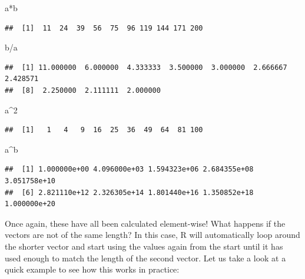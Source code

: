 \documentclass[
]{book}
\newenvironment{Shaded}{\begin{snugshade}}{\end{snugshade}}
\newcommand{\DecValTok}[1]{\textcolor[rgb]{0.00,0.00,0.81}{#1}}
\newcommand{\NormalTok}[1]{#1}
\newcommand{\SpecialCharTok}[1]{\textcolor[rgb]{0.00,0.00,0.00}{#1}}
\theoremstyle{definition}
\theoremstyle{definition}
\theoremstyle{definition}
\theoremstyle{definition}
\theoremstyle{remark}
\begin{document}
\begin{Shaded}
\begin{Highlighting}[]
\NormalTok{a}\SpecialCharTok{*}\NormalTok{b}
\end{Highlighting}
\end{Shaded}

\begin{verbatim}
##  [1]  11  24  39  56  75  96 119 144 171 200
\end{verbatim}

\begin{Shaded}
\begin{Highlighting}[]
\NormalTok{b}\SpecialCharTok{/}\NormalTok{a}
\end{Highlighting}
\end{Shaded}

\begin{verbatim}
##  [1] 11.000000  6.000000  4.333333  3.500000  3.000000  2.666667  2.428571
##  [8]  2.250000  2.111111  2.000000
\end{verbatim}

\begin{Shaded}
\begin{Highlighting}[]
\NormalTok{a}\SpecialCharTok{\^{}}\DecValTok{2}
\end{Highlighting}
\end{Shaded}

\begin{verbatim}
##  [1]   1   4   9  16  25  36  49  64  81 100
\end{verbatim}

\begin{Shaded}
\begin{Highlighting}[]
\NormalTok{a}\SpecialCharTok{\^{}}\NormalTok{b}
\end{Highlighting}
\end{Shaded}

\begin{verbatim}
##  [1] 1.000000e+00 4.096000e+03 1.594323e+06 2.684355e+08 3.051758e+10
##  [6] 2.821110e+12 2.326305e+14 1.801440e+16 1.350852e+18 1.000000e+20
\end{verbatim}

Once again, these have all been calculated element-wise! What happens if the vectors are not of the same length? In this case, R will automatically loop around the shorter vector and start using the values again from the start until it has used enough to match the length of the second vector. Let us take a look at a quick example to see how this works in practice:
\end{document}
